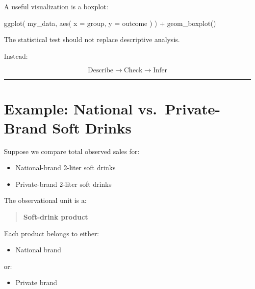 \documentclass[
  letterpaper,
  DIV=11,
  numbers=noendperiod]{scrreprt}
\newenvironment{Shaded}{\begin{snugshade}}{\end{snugshade}}
\newcommand{\AttributeTok}[1]{\textcolor[rgb]{0.40,0.45,0.13}{#1}}
\newcommand{\FunctionTok}[1]{\textcolor[rgb]{0.28,0.35,0.67}{#1}}
\newcommand{\NormalTok}[1]{\textcolor[rgb]{0.00,0.23,0.31}{#1}}
\newcommand{\SpecialCharTok}[1]{\textcolor[rgb]{0.37,0.37,0.37}{#1}}
\providecommand{\tightlist}{%
  \setlength{\itemsep}{0pt}\setlength{\parskip}{0pt}}
\begin{document}
A useful visualization is a boxplot:

\begin{Shaded}
\begin{Highlighting}[]
\FunctionTok{ggplot}\NormalTok{(}
\NormalTok{    my\_data,}
    \FunctionTok{aes}\NormalTok{(}
        \AttributeTok{x =}\NormalTok{ group,}
        \AttributeTok{y =}\NormalTok{ outcome}
\NormalTok{    )}
\NormalTok{) }\SpecialCharTok{+}
    \FunctionTok{geom\_boxplot}\NormalTok{()}
\end{Highlighting}
\end{Shaded}

The statistical test should not replace descriptive analysis.

Instead:

\[
\text{Describe}
\rightarrow
\text{Check}
\rightarrow
\text{Infer}
\]

\begin{center}\rule{0.5\linewidth}{0.5pt}\end{center}


\chapter{Example: National vs.~Private-Brand Soft
Drinks}\label{example-national-vs.-private-brand-soft-drinks}

Suppose we compare total observed sales for:

\begin{itemize}
\tightlist
\item
  National-brand 2-liter soft drinks
\item
  Private-brand 2-liter soft drinks
\end{itemize}

The observational unit is a:

\begin{quote}
\textbf{Soft-drink product}
\end{quote}

Each product belongs to either:

\begin{itemize}
\tightlist
\item
  National brand
\end{itemize}

or:

\begin{itemize}
\tightlist
\item
  Private brand
\end{itemize}
\end{document}
